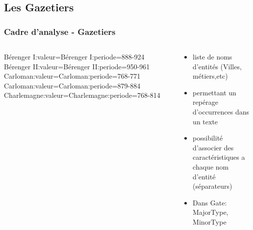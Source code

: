 \documentclass[10pt, compress]{beamer}
\begin{document}
\subsection{Les Gazetiers}
\begin{frame}[fragile]
\frametitle{Cadre d'analyse - Gazetiers}
\begin{columns}
		\begin{scriptsize}
Bérenger I:valeur=Bérenger I:periode=888-924\\
Bérenger II:valeur=Bérenger II:periode=950-961
Carloman:valeur=Carloman:periode=768-771
Carloman:valeur=Carloman:periode=879-884
Charlemagne:valeur=Charlemagne:periode=768-814
		\end{scriptsize}
		\begin{scriptsize}
		\begin{itemize}
			\item{liste de noms d'entités (Villes, métiers,etc)}
			\item{permettant un repérage d’occurrences dans un texte}
			\item{possibilité d'associer des caractéristiques a chaque nom d'entité (séparateurs)}
			\item{Dans Gate: MajorType, MinorType}
		\end{itemize}
		\end{scriptsize}
	\end{columns}
\end{frame}
\end{document}
